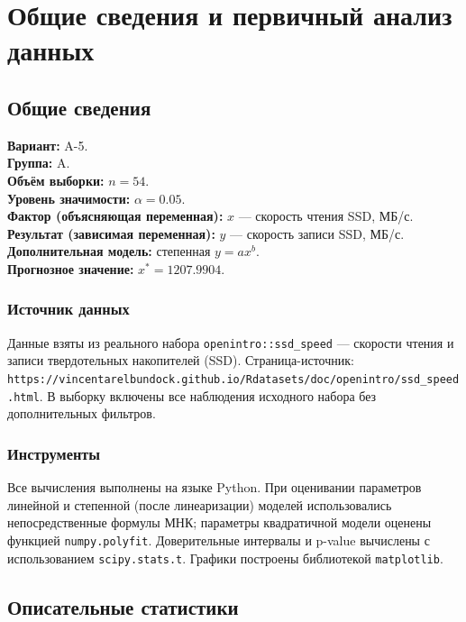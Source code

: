 \section{Общие сведения и первичный анализ данных}

\subsection{Общие сведения}

\textbf{Вариант:} A-5.\\
\textbf{Группа:} A.\\
\textbf{Объём выборки:} \(n = 54\).\\
\textbf{Уровень значимости:} \(\alpha = 0.05\).\\
\textbf{Фактор (объясняющая переменная):} \(x\) — скорость чтения SSD, МБ/с.\\
\textbf{Результат (зависимая переменная):} \(y\) — скорость записи SSD, МБ/с.\\
\textbf{Дополнительная модель:} степенная \(y = ax^b\).\\
\textbf{Прогнозное значение:} \(x^* = 1207.9904\).

\subsubsection{Источник данных}

Данные взяты из реального набора \texttt{openintro::ssd\_speed} — скорости чтения и записи твердотельных накопителей (SSD). Страница-источник: \texttt{https://vincentarelbundock.github.io/Rdatasets/doc/openintro/ssd\_speed.html}. В выборку включены все наблюдения исходного набора без дополнительных фильтров.

\subsubsection{Инструменты}

Все вычисления выполнены на языке Python. При оценивании параметров линейной и степенной (после линеаризации) моделей использовались непосредственные формулы МНК; параметры квадратичной модели оценены функцией \texttt{numpy.polyfit}. Доверительные интервалы и p-value вычислены с использованием \texttt{scipy.stats.t}. Графики построены библиотекой \texttt{matplotlib}.

\subsection{Описательные статистики}

